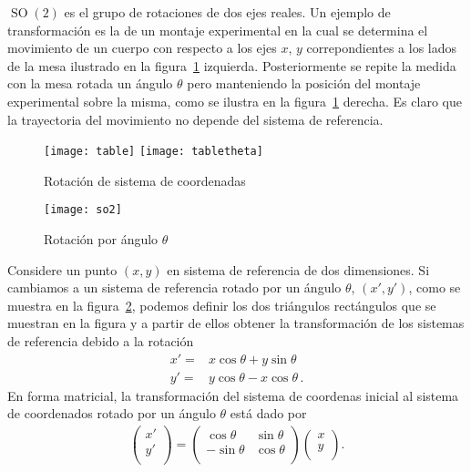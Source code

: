 $\operatorname{SO}(2)$ es el grupo de rotaciones de dos ejes reales. Un ejemplo de transformación es la de un montaje experimental en la cual se determina el movimiento de un cuerpo con respecto a los ejes $x$, $y$ correpondientes a los lados de la mesa ilustrado en la figura~\ref{fig:tabla} izquierda. Posteriormente se repite la medida con la mesa rotada un ángulo $\theta$ pero manteniendo la posición del montaje experimental sobre la misma, como se ilustra en la figura~\ref{fig:tabla} derecha. Es claro que la trayectoria del movimiento no depende del sistema de referencia.
\begin{figure}
  \centering
  \texttt{[image: table]}
  \texttt{[image: tabletheta]}
  \caption{Rotación de sistema de coordenadas}
  \label{fig:tabla}
\end{figure}




\begin{figure}
  \centering
  \texttt{[image: so2]}
  \caption{Rotación por ángulo $\theta$}
  \label{fig:so2}
\end{figure}



Considere un punto $(x,y)$ en sistema de referencia de dos dimensiones. Si cambiamos a un sistema de referencia rotado por un ángulo $\theta$, $(x',y')$, como se muestra en la figura~\ref{fig:so2}, podemos definir los dos triángulos rectángulos que se muestran en la figura y a partir de ellos obtener la transformación de los sistemas de referencia debido a la rotación
\begin{align}
  x'=&x\cos\theta+y\sin\theta \nonumber\\
  y'=&y\cos\theta-x\cos\theta\,.
\end{align}
En forma matricial, la transformación del sistema de coordenas inicial al sistema de coordenados rotado por un ángulo $\theta$ está dado por
\begin{align}
  \begin{pmatrix}
    x'\\
    y'\\
  \end{pmatrix}=
  \begin{pmatrix}
    \cos\theta & \sin\theta\\
    -\sin\theta& \cos\theta\\
  \end{pmatrix}
  \begin{pmatrix}
    x\\
    y\\
  \end{pmatrix}.
\end{align}

